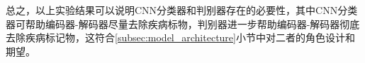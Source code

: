 总之，以上实验结果可以说明CNN分类器和判别器存在的必要性，其中CNN分类器可帮助编码器-解码器尽量去除疾病标物，判别器进一步帮助编码器-解码器彻底去除疾病标记物，这符合\ref{subsec:model_architecture}小节中对二者的角色设计和期望。

